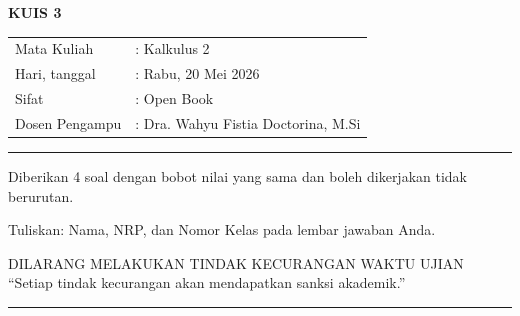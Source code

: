 \documentclass[a4paper,12pt]{article}
\begin{document}
\begin{center}
  {\Large \textbf{KUIS 3}}
\end{center}

\vspace{0.5cm}

\begin{tabular}{ll}
  Mata Kuliah    & : Kalkulus 2                        \\
  Hari, tanggal  & : Rabu, 20 Mei 2026                 \\
  Sifat          & : Open Book                         \\
  Dosen Pengampu & : Dra. Wahyu Fistia Doctorina, M.Si \\
\end{tabular}

\vspace{0.5cm}
\parindent=0pt
\rule{\textwidth}{2pt}
\vspace{0.1cm}


Diberikan 4 soal dengan bobot nilai yang sama dan boleh dikerjakan tidak berurutan.

Tuliskan: Nama, NRP, dan Nomor Kelas pada lembar jawaban Anda.

\vspace{0.5cm}

\begin{center}
  \textnormal{DILARANG MELAKUKAN TINDAK KECURANGAN WAKTU UJIAN} \\
  ``Setiap tindak kecurangan akan mendapatkan sanksi akademik.''
\end{center}

\vspace{0.1cm}
\rule{\textwidth}{2pt}
\vspace{0.5cm}
\end{document}

